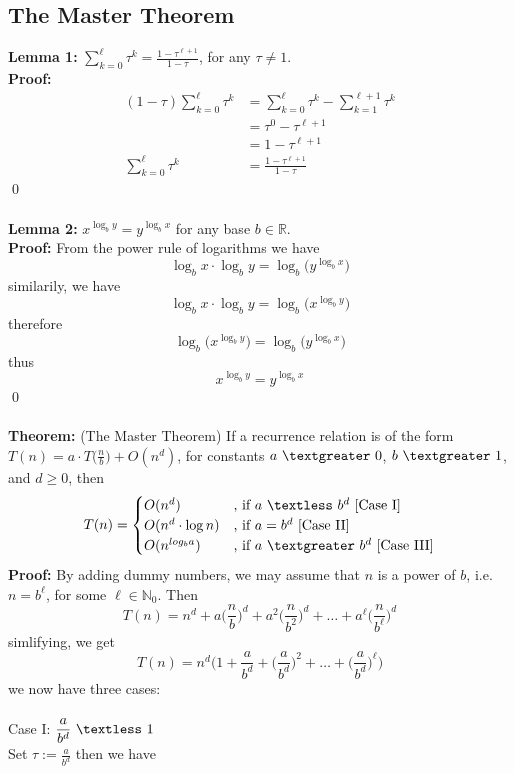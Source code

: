 \documentclass{article}
\newcommand{\tb}[1]{\textbf{#1}}
\newcommand{\N}{\mathbb{N}}
\newcommand{\R}{\mathbb{R}}
\newcommand{\lt}{\textless}
\newcommand{\gt}{\textgreater}
\newcommand{\x}{\cdot}
\newcommand{\thm}{\textbf{Theorem: }}
\newcommand{\proo}{\textbf{Proof: }}
\begin{document}
\subsection{The Master Theorem}
\tb{Lemma 1:} $\displaystyle \sum_{k=0}^{\ell} \tau^k = \frac{1-\tau^{\ell + 1}}{1-\tau}$, for any $\tau \neq 1$.\\
\proo
\begin{align*}
	(1-\tau)\sum_{k=0}^{\ell} \tau^k &= \sum_{k=0}^{\ell} \tau^k - \sum_{k=1}^{\ell+1} \tau^k\\
		&= \tau^0 - \tau^{\ell + 1}\\
		&= 1 - \tau^{\ell + 1}\\
	\sum_{k=0}^{\ell} \tau^k &= \frac{1 - \tau^{\ell + 1}}{1- \tau}
\end{align*}
\qed\\\\
\tb{Lemma 2:} $\displaystyle x^{\log_{b}y} = y^{\log_{b}x}$ for any base $b \in \R$.\\
\proo From the power rule of logarithms we have
\[\log_{b}x \x \log_{b}y = \log_{b}\big(y^{\log_{b}x}\big)\]
similarily, we have
\[\log_{b}x \x \log_{b}y = \log_{b}\big(x^{\log_{b}y}\big)\]
therefore
\[\log_{b}\big(x^{\log_{b}y}\big) = \log_{b}\big(y^{\log_{b}x}\big)\]
thus
\[x^{\log_{b}y} = y^{\log_{b}x}\]
\qed\\\\
\thm (The Master Theorem) If a recurrence relation is of the form $\displaystyle T(n) = a\x T\Big(\frac{n}{b}\Big) + O(n^d)$, for constants $a\ \gt\ 0$, $b\ \gt\ 1$, and $d \geq 0$, then
\[
T(n) =
\begin{cases}
	O(n^d) &\text{, if } a\ \lt\ b^d \text{ [Case I]}\\
	O(n^d\x \log n) &\text{, if } a = b^d \text{ [Case II]}\\
	O(n^{log_{b}a}) &\text{, if } a\ \gt\ b^d \text{ [Case III]}
\end{cases}
\]
\proo By adding dummy numbers, we may assume that $n$ is a power of $b$, i.e. $n = b^{\ell}$, for some $\ell \in \N_{0}$. Then
\[T(n) = n^d + a\Big(\frac{n}{b}\Big)^d + a^{2}\Big(\frac{n}{b^2}\Big)^d + \dots + a^{\ell}\Big(\frac{n}{b^{\ell}}\Big)^d\]
simlifying, we get
\[T(n) = n^d \bigg(1 + \frac{a}{b^d} + \Big(\frac{a}{b^d}\Big)^2 + \dots + \Big(\frac{a}{b^d}\Big)^{\ell}\bigg)\]
we now have three cases:\\\\
Case I: $\displaystyle \frac{a}{b^d}\ \lt\ 1$\\
Set $\displaystyle \tau := \frac{a}{b^d}$ then we have
\end{document}
